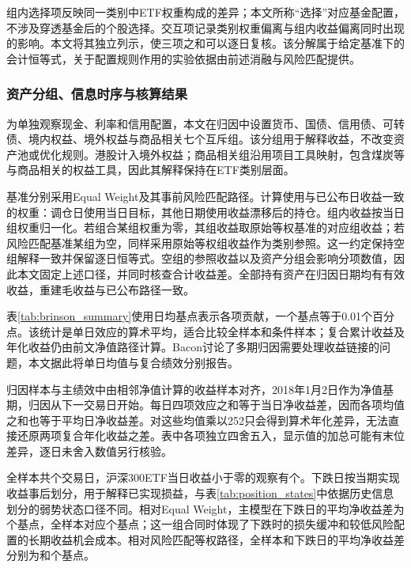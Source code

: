 组内选择项反映同一类别中ETF权重构成的差异；本文所称“选择”对应基金配置，不涉及穿透基金后的个股选择。交互项记录类别权重偏离与组内收益偏离同时出现的影响。本文将其独立列示，使三项之和可以逐日复核。该分解属于给定基准下的会计恒等式，关于配置规则作用的实验依据由前述消融与风险匹配提供。

\subsubsection{资产分组、信息时序与核算结果}
为单独观察现金、利率和信用配置，本文在归因中设置货币、国债、信用债、可转债、境内权益、境外权益与商品相关七个互斥组。该分组用于解释收益，不改变资产池或优化规则。港股计入境外权益；商品相关组沿用项目工具映射，包含煤炭等与商品相关的权益工具，因此其解释保持在ETF类别层面。

基准分别采用Equal Weight及其事前风险匹配路径。计算使用与已公布日收益一致的权重：调仓日使用当日目标，其他日期使用收益漂移后的持仓。组内收益按当日组权重归一化。若组合某组权重为零，其组收益取原始等权基准的对应组收益；若风险匹配基准某组为空，同样采用原始等权组收益作为类别参照。这一约定保持空组解释一致并保留逐日恒等式。空组的参照收益以及资产分组会影响分项数值，因此本文固定上述口径，并同时核查合计收益差。全部持有资产在归因日期均有有效收益，重建毛收益与已公布路径一致。

表\ref{tab:brinson_summary}使用日均基点表示各项贡献，一个基点等于0.01个百分点。该统计是单日效应的算术平均，适合比较全样本和条件样本；复合累计收益及年化收益仍由前文净值路径计算。Bacon讨论了多期归因需要处理收益链接的问题\cite{bacon2019attribution}，本文据此将单日均值与复合绩效分别报告。

归因样本与主绩效中由相邻净值计算的收益样本对齐，2018年1月2日作为净值基期，归因从下一交易日开始。每日四项效应之和等于当日净收益差，因而各项均值之和也等于平均日净收益差。对这些均值乘以252只会得到算术年化差异，无法直接还原两项复合年化收益之差。表中各项独立四舍五入，显示值的加总可能有末位差异，逐日未舍入数值另行核验。



全样本共\attrDays{}个交易日，沪深300ETF当日收益小于零的观察有\attrDownDays{}个。下跌日按当期实现收益事后划分，用于解释已实现损益，与表\ref{tab:position_states}中依据历史信息划分的弱势状态口径不同。相对Equal Weight，主模型在下跌日的平均净收益差为\attrEqualNetDown{}个基点，全样本对应\attrEqualNetAll{}个基点；这一组合同时体现了下跌时的损失缓冲和较低风险配置的长期收益机会成本。相对风险匹配等权路径，全样本和下跌日的平均净收益差分别为\attrMatchedNetAll{}和\attrMatchedNetDown{}个基点。

\begin{table}[htbp]\centering
\caption{各资产组的配置效应：平均单日贡献（基点）}\label{tab:brinson_allocation}
\fitthesistable{}
\end{table}
\FloatBarrier

